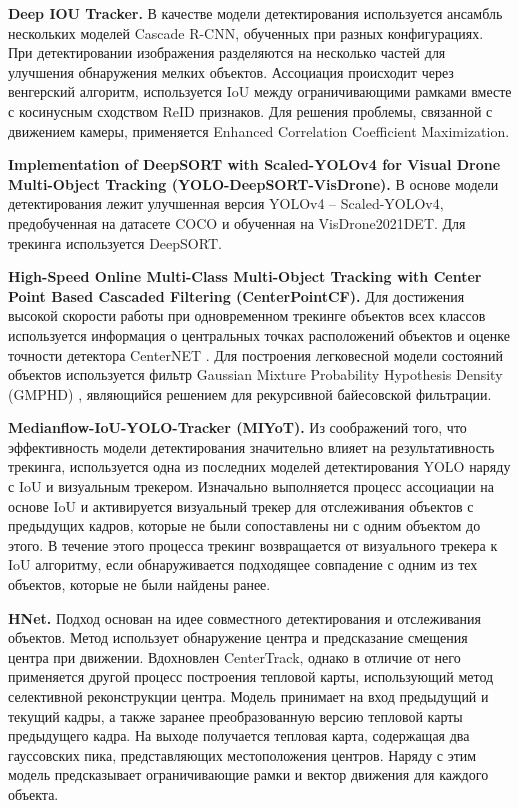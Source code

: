 \textbf{Deep IOU Tracker.} В качестве модели детектирования используется ансамбль нескольких моделей Cascade R-CNN, обученных при разных конфигурациях. При детектировании изображения разделяются на несколько частей для улучшения обнаружения мелких объектов. Ассоциация происходит через венгерский алгоритм, используется IoU между ограничивающими рамками вместе с косинусным сходством ReID признаков. Для решения проблемы, связанной с движением камеры, применяется Enhanced Correlation Coefficient Maximization.

\textbf{Implementation of DeepSORT with Scaled-YOLOv4 for Visual Drone Multi-Object Tracking (YOLO-DeepSORT-VisDrone).} В основе модели детектирования лежит улучшенная версия YOLOv4 -- Scaled-YOLOv4, предобученная на датасете COCO и обученная на VisDrone2021DET. Для трекинга используется DeepSORT.

\textbf{High-Speed Online Multi-Class Multi-Object Tracking with Center Point Based Cascaded Filtering (CenterPointCF).} Для достижения высокой скорости работы при одновременном трекинге объектов всех классов используется информация о центральных точках расположений объектов и оценке точности детектора CenterNET \cite{14-5}. Для построения легковесной модели состояний объектов используется фильтр Gaussian Mixture Probability Hypothesis Density (GMPHD) \cite{14-6}, являющийся решением для рекурсивной байесовской фильтрации.

\textbf{Medianflow-IoU-YOLO-Tracker (MIYoT).} Из соображений того, что эффективность модели детектирования значительно влияет на результативность трекинга, используется одна из последних моделей детектирования YOLO наряду с IoU и визуальным трекером. Изначально выполняется процесс ассоциации на основе IoU и активируется визуальный трекер для отслеживания объектов с предыдущих кадров, которые не были сопоставлены ни с одним объектом до этого. В течение этого процесса трекинг возвращается от визуального трекера к IoU алгоритму, если обнаруживается подходящее совпадение с одним из тех объектов, которые не были найдены ранее.

\textbf{HNet.} \cite{14-7} Подход основан на идее совместного детектирования и отслеживания объектов. Метод использует обнаружение центра и предсказание смещения центра при движении. Вдохновлен CenterTrack, однако в отличие от него применяется другой процесс построения тепловой карты, использующий метод селективной реконструкции центра. Модель принимает на вход предыдущий и текущий кадры, а также заранее преобразованную версию тепловой карты предыдущего кадра. На выходе получается тепловая карта, содержащая два гауссовских пика, представляющих местоположения центров. Наряду с этим модель предсказывает ограничивающие рамки и вектор движения для каждого объекта.
